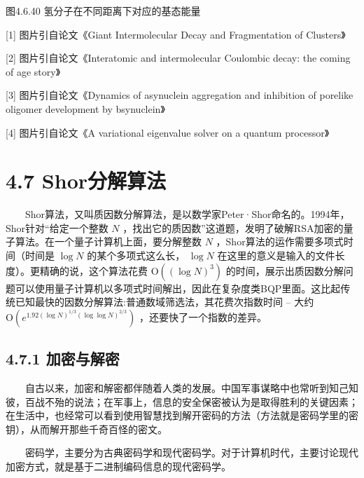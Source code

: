 \documentclass[a4paper,11pt,english]{sphinxmanual}
\begin{document}
\begin{center}图4.6.40 氢分子在不同距离下对应的基态能量
\end{center}
\sphinxAtStartPar
{} 

\sphinxAtStartPar
{[}1{]} 图片引自论文《Giant Intermolecular Decay and Fragmentation of Clusters》

\sphinxAtStartPar
{[}2{]} 图片引自论文《Interatomic and intermolecular Coulombic decay: the coming of age story》

\sphinxAtStartPar
{[}3{]} 图片引自论文《Dynamics of a\sphinxhyphen{}synuclein aggregation and inhibition of pore\sphinxhyphen{}like oligomer development by b\sphinxhyphen{}synuclein》

\sphinxAtStartPar
{[}4{]} 图片引自论文《A variational eigenvalue solver on a quantum processor》

\sphinxstepscope


\section{4.7 Shor分解算法}
\label{\detokenize{rst/4.7Shor_u5206_u89e3_u7b97_u6cd5:shor}}\label{\detokenize{rst/4.7Shor_u5206_u89e3_u7b97_u6cd5::doc}}
\sphinxAtStartPar
  Shor算法，又叫质因数分解算法，是以数学家Peter·Shor命名的。1994年，Shor针对“给定一个整数 \(N\) ，找出它的质因数”这道题，发明了破解RSA加密的量子算法。在一个量子计算机上面，要分解整数 \(N\) ，Shor算法的运作需要多项式时间（时间是 \(\log N\) 的某个多项式这么长， \(\log N\) 在这里的意义是输入的文件长度）。更精确的说，这个算法花费 \(\mathrm{O}((\log N)^3)\) 的时间，展示出质因数分解问题可以使用量子计算机以多项式时间解出，因此在复杂度类BQP里面。这比起传统已知最快的因数分解算法:普通数域筛选法，其花费次指数时间 – 大约 \(\mathrm{O}\left(e^{1.92(\log N)^{1 / 3}(\log \log N) ^{2 / 3}}\right)\) ，还要快了一个指数的差异。


\subsection{4.7.1 加密与解密}
\label{\detokenize{rst/4.7Shor_u5206_u89e3_u7b97_u6cd5:id1}}
\sphinxAtStartPar
  自古以来，加密和解密都伴随着人类的发展。中国军事谋略中也常听到知己知彼，百战不殆的说法；在军事上，信息的安全保密被认为是取得胜利的关键因素；在生活中，也经常可以看到使用智慧找到解开密码的方法（方法就是密码学里的密钥），从而解开那些千奇百怪的密文。

\sphinxAtStartPar
  密码学，主要分为古典密码学和现代密码学。对于计算机时代，主要讨论现代加密方式，就是基于二进制编码信息的现代密码学。
\end{document}

